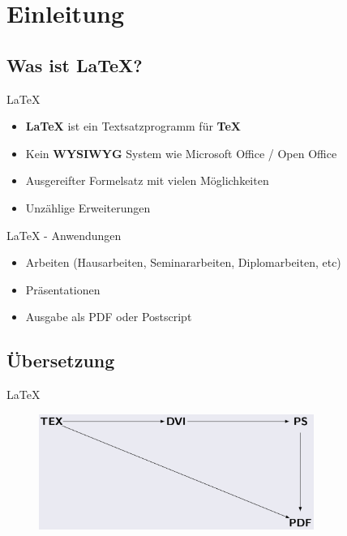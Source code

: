 \section{Einleitung}


\subsection{Was ist LaTeX?}

\begin{frame}
	\begin{block}{LaTeX}
		\begin{itemize}[<+->]
			\item \textbf{LaTeX} ist ein Textsatzprogramm für \textbf{TeX}
			\item Kein \textbf{WYSIWYG} System wie Microsoft Office / Open Office
			\item Ausgereifter Formelsatz mit vielen Möglichkeiten
			\item Unzählige Erweiterungen
		\end{itemize}
	\end{block}
\end{frame}

\begin{frame}
	\begin{block}{LaTeX - Anwendungen}
		\begin{itemize}[<+->]
			\item Arbeiten (Hausarbeiten, Seminararbeiten, Diplomarbeiten, etc)
			\item Präsentationen
			\item Ausgabe als PDF oder Postscript
		\end{itemize}
	\end{block}
\end{frame}

\subsection{Übersetzung}

\begin{frame}
	\begin{block}{LaTeX}
  \begin{figure}
    \centering
    \includegraphics[width=0.8\textwidth]{images/Auswahl_049.eps}
  \end{figure}
	\end{block}
\end{frame}

